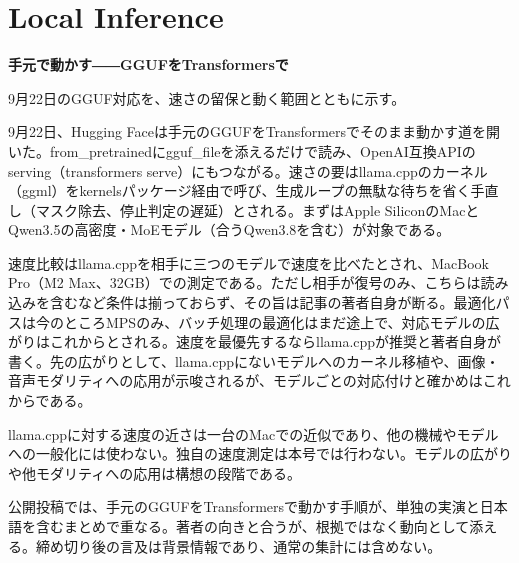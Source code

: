 \section{Local Inference}
\begin{wideflow}
{\Large\bfseries 手元で動かす――GGUFをTransformersで}\par
\smallskip
{\color{SurveyMuted}9月22日のGGUF対応を、速さの留保と動く範囲とともに示す。}\par
\end{wideflow}

9月22日、Hugging Faceは手元のGGUFをTransformersでそのまま動かす道を開いた\cite{hfgguf}。from\_pretrainedにgguf\_fileを添えるだけで読み、OpenAI互換APIのserving（transformers serve）にもつながる。速さの要はllama.cppのカーネル（ggml）をkernelsパッケージ経由で呼び、生成ループの無駄な待ちを省く手直し（マスク除去、停止判定の遅延）とされる。まずはApple SiliconのMacとQwen3.5の高密度・MoEモデル（合うQwen3.8を含む）が対象である。

速度比較はllama.cppを相手に三つのモデルで速度を比べたとされ、MacBook Pro（M2 Max、32GB）での測定である。ただし相手が復号のみ、こちらは読み込みを含むなど条件は揃っておらず、その旨は記事の著者自身が断る。最適化パスは今のところMPSのみ、バッチ処理の最適化はまだ途上で、対応モデルの広がりはこれからとされる。速度を最優先するならllama.cppが推奨と著者自身が書く。先の広がりとして、llama.cppにないモデルへのカーネル移植や、画像・音声モダリティへの応用が示唆されるが、モデルごとの対応付けと確かめはこれからである。

\begin{claimboundary}[資料と評価の境界]
llama.cppに対する速度の近さは一台のMacでの近似であり、他の機械やモデルへの一般化には使わない。独自の速度測定は本号では行わない。モデルの広がりや他モダリティへの応用は構想の段階である。
\end{claimboundary}

\begin{communitynote}
公開投稿では、手元のGGUFをTransformersで動かす手順が、単独の実演\cite{w39x-c3-walkthrough}と日本語を含むまとめ\cite{w39x-c3-jp,w39x-c3-summary}で重なる。著者の向きと合うが、根拠ではなく動向として添える。締め切り後の言及は背景情報であり、通常の集計には含めない。
\end{communitynote}
